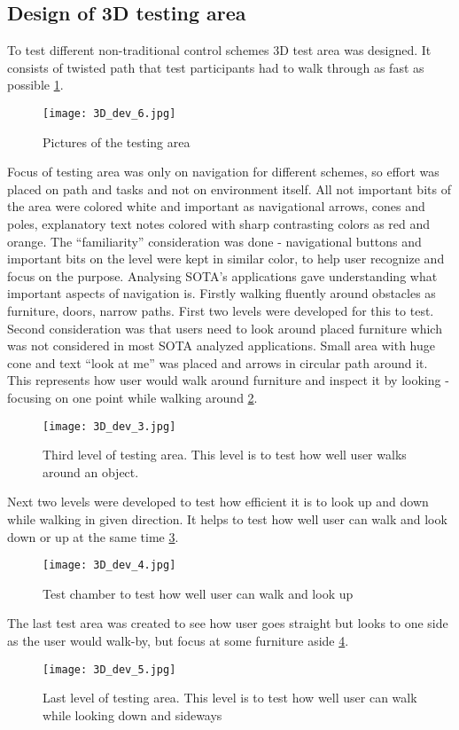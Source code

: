 \subsection{Design of 3D testing area}
To test different non-traditional control schemes 3D test area was designed. It consists of twisted path that test participants had to walk through as fast as possible \ref{TestLevels}.
\begin{figure}[H]
\centering
\texttt{[image: 3D\_dev\_6.jpg]}
\caption{Pictures of the testing area}
\label{TestLevels}
\end{figure}
Focus of testing area was only on navigation for different schemes, so effort was placed on path and tasks and not on environment itself. All not important bits of the area were colored white and important as navigational arrows, cones and poles, explanatory text notes colored with sharp contrasting colors as red and orange. The “familiarity” consideration was done - navigational buttons and important bits on the level were kept in similar color, to help user recognize and focus on the purpose.
Analysing SOTA’s applications gave understanding what important aspects of navigation is. Firstly walking fluently around obstacles as furniture, doors, narrow paths. First two levels were developed for this to test. Second consideration was that users need to look around placed furniture which was not considered in most SOTA analyzed applications. Small area with huge cone and text “look at me” was placed and arrows in circular path around it. This represents how user would walk around furniture and inspect it by looking - focusing on one point while walking around \ref{TestLevel3}.
\begin{figure}[H]
\centering
\texttt{[image: 3D\_dev\_3.jpg]}
\caption{Third level of testing area. This level is to test how well user walks around an object.}
\label{TestLevel3}
\end{figure}
Next two levels were developed to test how efficient it is to look up and down while walking in given direction. It helps to test how well user can walk and look down or up at the same time \ref{TestLevel4}.
\begin{figure}[H]
\centering
\texttt{[image: 3D\_dev\_4.jpg]}
\caption{Test chamber to test how well user can walk and look up}
\label{TestLevel4}
\end{figure}
The last test area was created to see how user goes straight but looks to one side as the user would walk-by, but focus at some furniture aside \ref{TestLevel5}.
\begin{figure}[H]
\centering
\texttt{[image: 3D\_dev\_5.jpg]}
\caption{Last level of testing area. This level is to test how well user can walk while looking down and sideways}
\label{TestLevel5}
\end{figure}